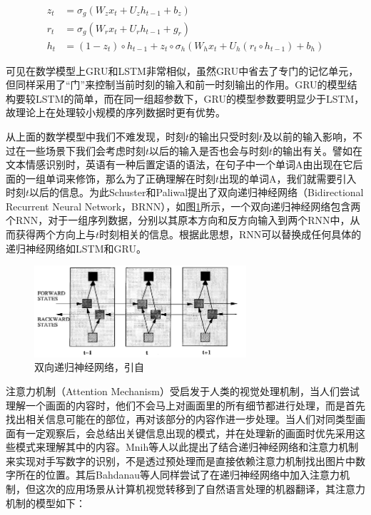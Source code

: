 \begin{align}
  \label{eq:gru}
  z_t &= \sigma_g (W_z x_t + U_z h_{t-1} + b_z) \\
  r_t &= \sigma_g (W_r x_t + U_r h_{t-1} + g_r) \\
  h_t &= (1 - z_t) \circ h_{t-1} + z_t \circ \sigma_h (W_h x_t + U_h (r_t \circ h_{t-1}) + b_h) 
\end{align}

可见在数学模型上GRU和LSTM非常相似，虽然GRU中省去了专门的记忆单元，但同样采用了“门”来控制当前时刻的输入和前一时刻输出的作用。GRU的模型结构要较LSTM的简单，而在同一组超参数下，GRU的模型参数要明显少于LSTM，故理论上在处理较小规模的序列数据时更有优势。

从上面的数学模型中我们不难发现，时刻$t$的输出只受时刻$t$及以前的输入影响，不过在一些场景下我们会考虑时刻$t$以后的输入是否也会与时刻$t$的输出有关。譬如在文本情感识别时，英语有一种后置定语的语法，在句子中一个单词A由出现在它后面的一组单词来修饰，那么为了正确理解在时刻$t$出现的单词A，我们就需要引入时刻$t$以后的信息。为此Schuster和Paliwal\cite{schuster1997bidirectional}提出了双向递归神经网络（Bidirectional Recurrent Neural Network，BRNN），如图\ref{fig:brnn}所示，一个双向递归神经网络包含两个RNN，对于一组序列数据，分别以其原本方向和反方向输入到两个RNN中，从而获得两个方向上与$t$时刻相关的信息。根据此思想，RNN可以替换成任何具体的递归神经网络如LSTM和GRU。

\begin{figure}[H]
  \centering
  \includegraphics[width=0.7\textwidth]{img/brnn.png}
  \caption{双向递归神经网络，引自\cite{schuster1997bidirectional}}
  \label{fig:brnn}
\end{figure}

注意力机制（Attention Mechanism）受启发于人类的视觉处理机制，当人们尝试理解一个画面的内容时，他们不会马上对画面里的所有细节都进行处理，而是首先找出相关信息可能在的部位，再对该部分的内容作进一步处理。当人们对同类型画面有一定观察后，会总结出关键信息出现的模式，并在处理新的画面时优先采用这些模式来理解其中的内容。Mnih等人\cite{mnih2014recurrent}以此提出了结合递归神经网络和注意力机制来实现对手写数字的识别，不是透过预处理而是直接依赖注意力机制找出图片中数字所在的位置。其后Bahdanau等人\cite{bahdanau2014neural}同样尝试了在递归神经网络中加入注意力机制，但这次的应用场景从计算机视觉转移到了自然语言处理的机器翻译，其注意力机制的模型如下：

